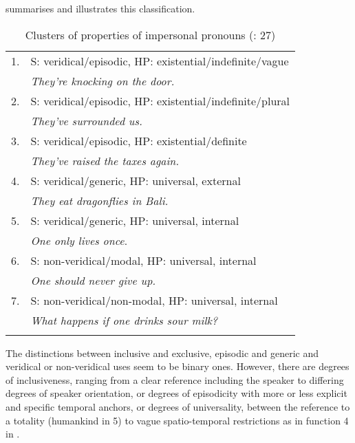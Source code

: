 \documentclass[output=paper]{langscibook}
\begin{document}
 summarises and illustrates this classification.


\begin{table}
    \begin{tabular}{ll}
    \lsptoprule
    {1.} & {S: veridical/episodic, HP: existential/indefinite/vague}\\
    & {\textit{They’re knocking on the door.}}\\ 
    \midrule
    {2.} & {S: veridical/episodic, HP: existential/indefinite/plural}\\
    & {\textit{They’ve surrounded us.}}\\
    \midrule
    {3.} & {S: veridical/episodic, HP: existential/definite}\\
    & {\textit{They’ve raised the taxes again.}}\\
    \midrule
    {4.} & {S: veridical/generic, HP: universal, external}\\
    & {\textit{They eat dragonflies in Bali.}}\\
    \midrule
    {5.} & {S: veridical/generic, HP: universal, internal}\\
    & {\textit{One only lives once}}.\\
    \midrule
    {6.} & {S: non-veridical/modal, HP: universal, internal}\\
    & {\textit{One should never give up.}}\\
    \midrule
    {7.} & {S: non-veridical/non-modal, HP: universal, internal}\\
    & {\textit{What happens if one drinks sour milk?}}\\
    \lspbottomrule
    \end{tabular}
    \caption{Clusters of properties of impersonal pronouns (\citealt{GastvanderAuwera2013}: 27)}
    \label{tab:amaral:1}
\end{table}





The distinctions between inclusive and exclusive, episodic and generic and veridical or non-veridical uses seem to be binary ones. However, there are degrees of inclusiveness, ranging from a clear reference including the speaker to differing degrees of speaker orientation, or degrees of episodicity with more or less explicit and specific temporal anchors, or degrees of universality, between the reference to a totality (humankind in 5) to vague spatio-temporal restrictions as in function 4 in . 
\end{document}
